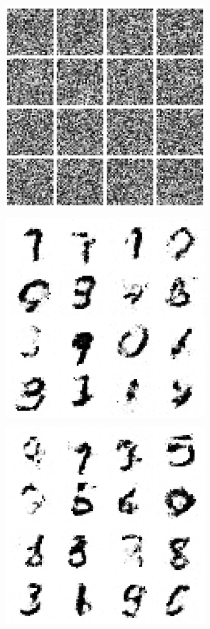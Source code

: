 \documentclass{article}
\begin{document}
\begin{figure}[t]
\begin{subfigure}{0.32\textwidth}
\centering
\includegraphics[scale=0.2]{img/nf_sample_0}
\end{subfigure}
\begin{subfigure}{0.32\textwidth}
\centering
\includegraphics[scale=0.2]{img/nf_sample_20}
\end{subfigure}
\begin{subfigure}{0.32\textwidth}
\centering
\includegraphics[scale=0.2]{img/nf_sample_40}

\end{subfigure}
\end{figure}
\end{document}
